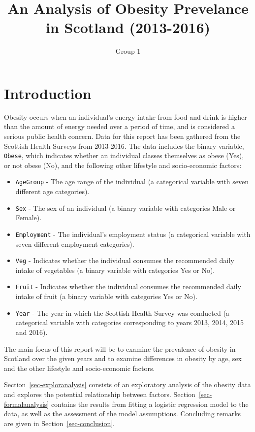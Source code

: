 \documentclass[
  letterpaper,
  DIV=11,
  numbers=noendperiod]{scrartcl}
\title{An Analysis of Obesity Prevelance in Scotland (2013-2016)}
\author{Group 1}
\date{}
\begin{document}
\maketitle

\section{Introduction}\label{sec-intro}

Obesity occurs when an individual's energy intake from food and drink is
higher than the amount of energy needed over a period of time, and is
considered a serious public health concern. Data for this report has
been gathered from the Scottish Health Surveys from 2013-2016. The data
includes the binary variable, \texttt{Obese}, which indicates whether an
individual classes themselves as obese (Yes), or not obese (No), and the
following other lifestyle and socio-economic factors:

\begin{itemize}
\item
  \texttt{AgeGroup} - The age range of the individual (a categorical
  variable with seven different age categories).
\item
  \texttt{Sex} - The sex of an individual (a binary variable with
  categories Male or Female).
\item
  \texttt{Employment} - The individual's employment status (a
  categorical variable with seven different employment categories).
\item
  \texttt{Veg} - Indicates whether the individual consumes the
  recommended daily intake of vegetables (a binary variable with
  categories Yes or No).
\item
  \texttt{Fruit} - Indicates whether the individual consumes the
  recommended daily intake of fruit (a binary variable with categories
  Yes or No).
\item
  \texttt{Year} - The year in which the Scottish Health Survey was
  conducted (a categorical variable with categories corresponding to
  years 2013, 2014, 2015 and 2016).
\end{itemize}

The main focus of this report will be to examine the prevalence of
obesity in Scotland over the given years and to examine differences in
obesity by age, sex and the other lifestyle and socio-economic factors.

Section~\ref{sec-exploranalysis} consists of an exploratory analysis of
the obesity data and explores the potential relationship between
factors. Section~\ref{sec-formalanalysis} contains the results from
fitting a logistic regression model to the data, as well as the
assessment of the model assumptions. Concluding remarks are given in
Section~\ref{sec-conclusion}.
\end{document}
